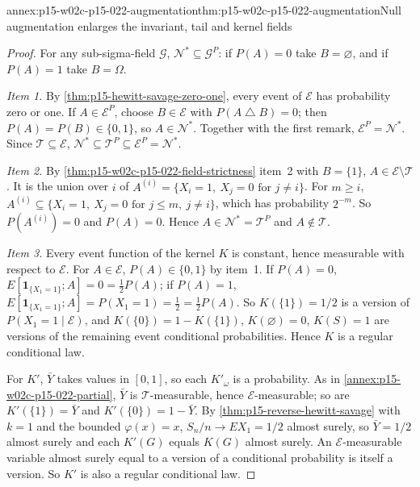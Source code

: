 \begin{annexitem}{annex:p15-w02c-p15-022-augmentation}{thm:p15-w02c-p15-022-augmentation}{Null augmentation enlarges the invariant, tail and kernel fields}
\begin{proof}
For any sub-sigma-field \(\mathcal G\), \(\mathcal N^*\subseteq\mathcal
G^{P}\): if \(P(A)=0\) take \(B=\varnothing\), and if \(P(A)=1\) take
\(B=\Omega\).

\emph{Item 1.} By \cref{thm:p15-hewitt-savage-zero-one}, every event of
\(\mathcal E\) has probability zero or one. If \(A\in\mathcal E^{P}\),
choose \(B\in\mathcal E\) with \(P(A\mathbin{\triangle}B)=0\); then
\(P(A)=P(B)\in\{0,1\}\), so \(A\in\mathcal N^*\). Together with the
first remark, \(\mathcal E^{P}=\mathcal N^*\). Since
\(\mathcal T\subseteq\mathcal E\),
\(\mathcal N^*\subseteq\mathcal T^{P}\subseteq\mathcal E^{P}=\mathcal N^*\).

\emph{Item 2.} By \cref{thm:p15-w02c-p15-022-field-strictness} item~2
with \(B=\{1\}\), \(A\in\mathcal E\setminus\mathcal T\). It is the union
over \(i\) of \(A^{(i)}=\{X_i=1,\ X_j=0\text{ for }j\neq i\}\). For
\(m\geq i\), \(A^{(i)}\subseteq\{X_i=1,\ X_j=0\text{ for }j\leq m,\
j\neq i\}\), which has probability \(2^{-m}\). So \(P(A^{(i)})=0\) and
\(P(A)=0\). Hence \(A\in\mathcal N^*=\mathcal T^{P}\) and
\(A\notin\mathcal T\).

\emph{Item 3.} Every event function of the kernel \(K\) is constant,
hence measurable with respect to \(\mathcal E\). For \(A\in\mathcal E\), \(P(A)\in\{0,1\}\) by
item~1. If \(P(A)=0\), \(E[\mathbf1_{\{X_1=1\}};A]=0=\tfrac12P(A)\); if
\(P(A)=1\), \(E[\mathbf1_{\{X_1=1\}};A]=P(X_1=1)=\tfrac12=\tfrac12P(A)\).
So \(K(\{1\})=1/2\) is a version of \(P(X_1=1\mid\mathcal E)\), and
\(K(\{0\})=1-K(\{1\})\), \(K(\varnothing)=0\), \(K(S)=1\) are versions of
the remaining event conditional probabilities. Hence \(K\) is a regular
conditional law.

For \(K'\), \(\bar Y\) takes values in \([0,1]\), so each \(K'_\omega\) is
a probability. As in \cref{annex:p15-w02c-p15-022-partial},
\(\bar Y\) is \(\mathcal T\)-measurable, hence \(\mathcal E\)-measurable;
so are \(K'(\{1\})=\bar Y\) and \(K'(\{0\})=1-\bar Y\). By
\cref{thm:p15-reverse-hewitt-savage} with \(k=1\) and the bounded
\(\varphi(x)=x\), \(S_n/n\to EX_1=1/2\) almost surely, so \(\bar Y=1/2\)
almost surely and each \(K'(G)\) equals \(K(G)\) almost surely. An
\(\mathcal E\)-measurable variable almost surely equal to a version of a
conditional probability is itself a version. So \(K'\) is also a regular
conditional law.


\end{proof}
\end{annexitem}
